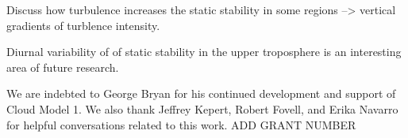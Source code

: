 \documentclass{ametsoc}
\begin{document}
Discuss how turbulence increases the static stability in some regions --> vertical gradients of turblence intensity.

Diurnal variability of of static stability in the upper troposphere is an interesting area of future research.








%
\acknowledgments
We are indebted to George Bryan for his continued development and support of Cloud Model 1.
We also thank Jeffrey Kepert, Robert Fovell, and Erika Navarro for helpful conversations related to this work.
ADD GRANT NUMBER
\end{document}
